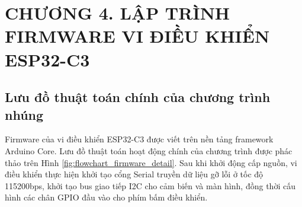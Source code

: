 \section*{CHƯƠNG 4. LẬP TRÌNH FIRMWARE VI ĐIỀU KHIỂN ESP32-C3}
\setcounter{section}{4}
\setcounter{subsection}{0}
\setcounter{figure}{0}
\setcounter{table}{0}

\subsection{Lưu đồ thuật toán chính của chương trình nhúng}
Firmware của vi điều khiển ESP32-C3 được viết trên nền tảng framework Arduino Core. Lưu đồ thuật toán hoạt động chính của chương trình được phác thảo trên Hình \ref{fig:flowchart_firmware_detail}. Sau khi khởi động cấp nguồn, vi điều khiển thực hiện khởi tạo cổng Serial truyền dữ liệu gỡ lỗi ở tốc độ 115200bps, khởi tạo bus giao tiếp I2C cho cảm biến và màn hình, đồng thời cấu hình các chân GPIO đầu vào cho phím bấm điều khiển.

